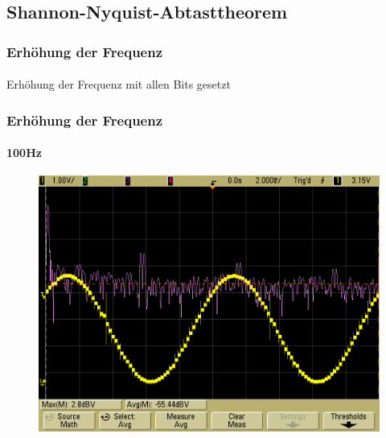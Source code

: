 \subsection{Shannon-Nyquist-Abtasttheorem} %
\label{sub:Shannon-Nyquist-Abtasttheorem}

\begin{frame}
    \frametitle{Erhöhung der Frequenz}
    \framesubtitle{}
     \begin{block}{}
         Erhöhung der Frequenz mit allen Bits gesetzt
     \end{block}
\end{frame}
\begin{frame}
    \frametitle{Erhöhung der Frequenz}
    \framesubtitle{100Hz}
            \begin{figure}[H]
            \begin{center}
                    \includegraphics[scale=0.2]{./img/oszi/scope_21.png}
            \end{center}
            \end{figure}
\end{frame}
